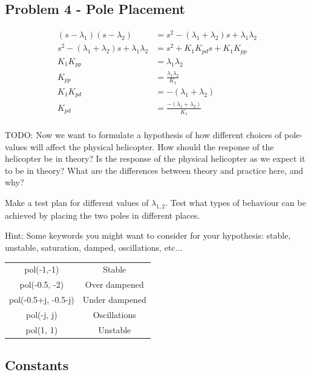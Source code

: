 \subsection{Problem 4 - Pole Placement}

\begin{align*}
    (s - \lambda_1) (s - \lambda_2) &= s^2 - (\lambda_1 + \lambda_2) s + \lambda_1 \lambda_2\\
    s^2 - (\lambda_1 + \lambda_2) s + \lambda_1 \lambda_2 &= s^2 + K_1 K_{pd} s + K_1 K_{pp}\\
    K_1 K_{pp} &= \lambda_1 \lambda_2\\
    K_{pp} &= \frac{\lambda_1 \lambda_2}{K_1}\\
    K_1 K_{pd} &= -(\lambda_1 + \lambda_2)\\
    K_{pd} &= \frac{-(\lambda_1 + \lambda_2)}{K_1}\\
\end{align*}

TODO: Now we want to formulate a hypothesis of how different choices of pole-values will affect the
physical helicopter. 
How should the response of the helicopter be in theory? 
Is the response of the physical helicopter as we expect it to be in theory? 
What are the differences between theory and practice here, and why?

Make a test plan for different values of $\lambda_{1,2}$. Test what types of behaviour can be achieved by placing the two poles in different places.

Hint: Some keywords you might want to consider for your hypothesis: stable, unstable, saturation, damped, oscillations, etc...


\begin{tabular}{ c|c } 
    pol(-1,-1) & Stable \\
    pol(-0.5, -2) & Over dampened \\
    pol(-0.5+j, -0.5-j) & Under dampened \\
    pol(-j, j) & Oscillations \\
    pol(1, 1) & Unstable \\
\end{tabular}



\subsection{Constants}

